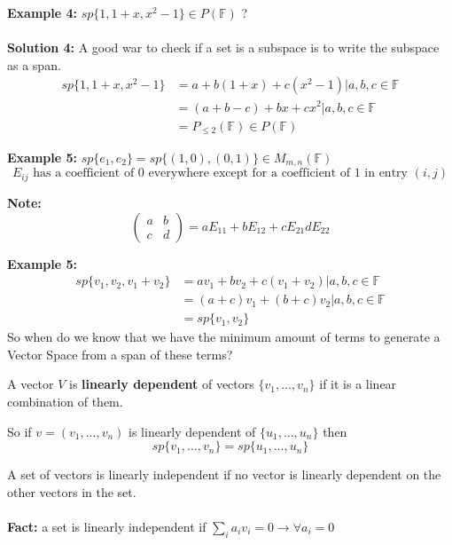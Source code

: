 \documentclass[12pt]{article}
\begin{document}
\textbf{Example 4:} $sp\{1, 1+x, x^2 -1 \} \in P(\mathbb{F})$ ?\\
\\
\textbf{Solution 4:} A good war to check if a set is a subspace is to write the subspace as a span.\\
\begin{align*}
	sp\{1, 1+x, x^2 -1 \} &= a + b(1 + x) + c(x^2 - 1) | a,b,c \in\mathbb{F}\\
	&= (a+b-c) + bx + cx^2 | a,b,c \in\mathbb{F}\\
	&= P_{\leq 2} (\mathbb{F}) \in P(\mathbb{F})
\end{align*}

\textbf{Example 5:} $sp\{e_1, e_2 \} = sp\{(1,0), (0,1) \} \in M_{m,n} (\mathbb{F})$
$$E_{ij} \text{ has a coefficient of 0 everywhere except for a coefficient of 1 in entry } (i,j)$$

\textbf{Note:} $$\left( \begin{smallmatrix} a&b\\ c&d \end{smallmatrix} \right) = aE_{11} + bE_{12} + cE_{21} dE_{22}$$

\textbf{Example 5:}
\begin{align*}
	sp\{v_1, v_2, v_1 + v_2 \} &= av_1 + bv_2 + c(v_1 + v_2) |a,b,c \in\mathbb{F}\\
	&= (a+c)v_1 + (b+c)v_2 |a,b,c \in\mathbb{F}\\
	&= sp\{v_1, v_2 \}
\end{align*}
So when do we know that we have the minimum amount of terms to generate a Vector Space from a span of these terms?

\begin{tcolorbox}[title=Definition: Linearly Dependent]
	A vector $V$ is \textbf{linearly dependent} of vectors $\{v_1, ... , v_n \}$ if it is a linear combination of them.
\end{tcolorbox}

So if $v = (v_1, ... , v_n)$ is linearly dependent of $\{u_1, ... , u_n \}$ then $$sp\{v_1, ... , v_n \} = sp\{u_1, ... , u_n \}$$

A set of vectors is linearly independent if no vector is linearly dependent on the other vectors in the set.\\
\\
\textbf{Fact:} a set is linearly independent if $\sum_i a_i v_i = 0 \longrightarrow \forall a_i = 0$
\end{document}
